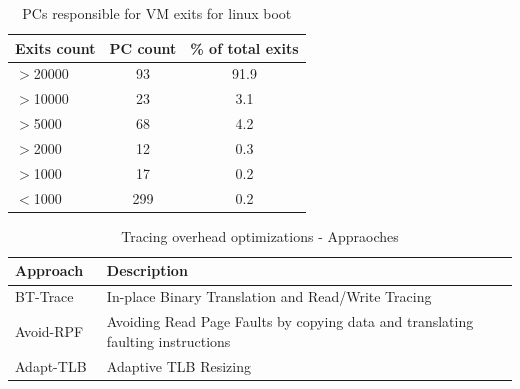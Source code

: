 \documentclass[10pt,twocolumn]{article}
\begin{document}
\begin{table}[!b]
\centering
\caption{PCs responsible for VM exits for linux boot}
     \begin{tabular}{lcc} \hline
       Exits count  & PC count & \% of total exits  \\ \hline
       $>$20000 & 93 & 91.9  \\
       $>$10000 & 23 & 3.1  \\
       $>$5000 & 68 & 4.2  \\
       $>$2000 & 12 & 0.3 \\
       $>$1000 & 17 & 0.2 \\
       $<$1000 & 299 & 0.2 \\
       \hline
     \end{tabular}
\label{tab:NumPCBase}
\end{table}


\begin{table}[!b]
\centering
\caption{Tracing overhead optimizations - Appraoches}
     \begin{tabular}{|l | p{5cm} |} \hline
       Approach \verb, , & Description \\ \hline
       BT-Trace & In-place Binary Translation and Read/Write Tracing \\ \hline
       Avoid-RPF & Avoiding Read Page Faults by copying data and translating faulting instructions  \\\hline
	   Adapt-TLB & Adaptive TLB Resizing  \\\hline

     \end{tabular}
\label{tab:diff_approaches}
\end{table}
\end{document}
